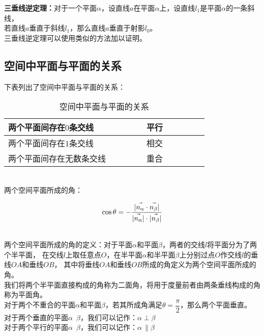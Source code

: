 \documentclass[UTF8]{ctexart}
\let\nvec\vec
\def\vec#1{\nvec{\vphantom b\smash{#1}}}
\begin{document}
    \textbf{三垂线逆定理：}对于一个平面$\alpha$，设直线$a$在平面$\alpha$上，设直线$l_1$是平面$\alpha$的一条斜线，\\
    若直线$a$垂直于斜线$l_1$，那么直线$a$垂直于射影$l_0$。\\[4mm]
    三垂线逆定理可以使用类似的方法加以证明。

\newpage

\subsection{空间中平面与平面的关系}
    下表列出了空间中平面与平面的关系：
    \begin{table}[h]
        \begin{center}
            \begin{tabular}{l|l}
                \hline
                两个平面间存在$0$条交线~~~~~~~~&平行~~~~~~~~\\ \hline
                两个平面间存在$1$条交线~~~~~~~~&相交~~~~~~~~\\ \hline
                两个平面间存在无数条交线~~~~~~~~&重合~~~~~~~~\\ \hline
            \end{tabular}
            \caption{空间中平面与平面的关系}
        \end{center}
    \end{table}\\
    两个空间平面所成的角：
    \begin{large}
        \begin{equation*}
            \cos{\theta}=-\frac{|\vec{n_\alpha}\cdot\vec{n_\beta}|}{|\vec{n_\alpha}|\cdot|\vec{n_\beta}|}
        \end{equation*}
    \end{large}\\
    两个空间平面所成的角的定义：对于平面$\alpha$和平面$\beta$，两者的交线$l$将平面分为了两个半平面，
    在交线$l$上取任意点$O$，在半平面$\alpha$和半平面$\beta$上分别过点$O$作交线$l$的垂线$OA$和垂线$OB$，
    其中将垂线$OA$和垂线$OB$所成的角定义为两个空间平面所成的角。\\[3mm]
    我们将两个半平面直接构成的角称为二面角，将用于度量前者由两条垂线构成的角称为平面角。\\[3mm]
    对于两个不重合的平面$\alpha$和平面$\beta$，若其所成角满足$\theta=\dfrac{\pi}{2}$，那么两个平面垂直。\\[3mm]
    对于两个垂直的平面$\alpha$~$\beta$，我们可以记作：$\alpha\perp\beta$\\[3mm]
    对于两个平行的平面$\alpha$~$\beta$，我们可以记作：$\alpha\,\parallel\beta$\\[6mm]
\end{document}
